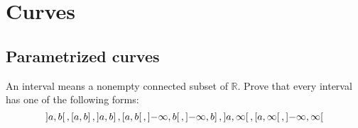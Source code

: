 \chapter{Curves}

\section{Parametrized curves}

\begin{exercise}{1.1}
	An interval means a nonempty connected subset of $\mathbb{R}$. Prove that every interval has one of the following forms:
	\begin{equation*}
		\left]{a, b}\right[, \left[{a, b}\right], \left]{a, b}\right], \left[{a, b}\right[, \left]{-\infty, b}\right[, \left]{-\infty, b}\right], \left]{a, \infty}\right[, \left[{a, \infty}\right[, \left]{-\infty, \infty}\right[
	\end{equation*}
\end{exercise}

